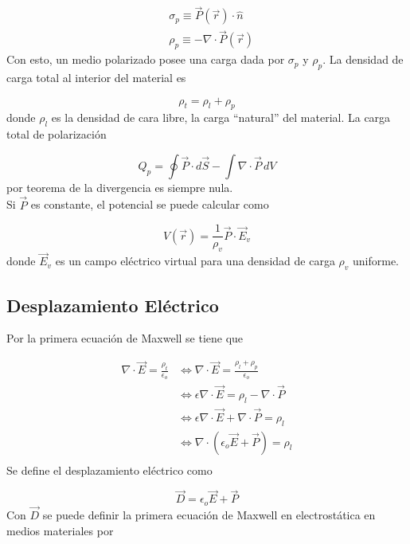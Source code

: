 \begin{equation}
\begin{split}
    &\sigma_p \equiv \Vec{P}(\Vec{r})\cdot\hat{n}\\
    &\rho_p \equiv -\nabla\cdot\Vec{P}(\Vec{r})
\end{split}
\nonumber
\end{equation}
\bigbreak
Con esto, un medio polarizado posee una carga dada por $\sigma_p$ y $\rho_p$. La densidad de carga total al interior del material es

\[\rho_t = \rho_l+\rho_p\]
\bigbreak
donde $\rho_l$ es la densidad de cara libre, la carga ``natural'' del material. La carga total de polarización

\[Q_p=\oint \Vec{P}\cdot d\Vec{S}-\int\nabla\cdot\Vec{P}\,dV\]
\bigbreak
por teorema de la divergencia es siempre nula.\\

Si $\Vec{P}$ es constante, el potencial se puede calcular como

\[V(\Vec{r})=\frac{1}{\rho_v}\Vec{P}\cdot\Vec{E}_v\]
\bigbreak
donde $\Vec{E}_v$ es un campo eléctrico virtual para una densidad de carga $\rho_v$ uniforme.

\subsection{Desplazamiento Eléctrico}

Por la primera ecuación de Maxwell se tiene que

\begin{equation}
\begin{split}
    \nabla\cdot\Vec{E} = \frac{\rho_t}{\epsilon_o}
    & \Leftrightarrow \nabla\cdot\Vec{E} = \frac{\rho_l+\rho_p}{\epsilon_o}\\
    &\Leftrightarrow \epsilon\nabla\cdot\Vec{E}=\rho_l -
    \nabla\cdot\Vec{P}\\
    &\Leftrightarrow \epsilon\nabla\cdot\Vec{E}
    +\nabla\cdot\Vec{P}=\rho_l\\
    &\Leftrightarrow\nabla\cdot\left(\epsilon_o
    \Vec{E}+\Vec{P}\right) = \rho_l\\
\end{split}
\nonumber
\end{equation}
\bigbreak
Se define el desplazamiento eléctrico como

\[\Vec{D}=\epsilon_o\Vec{E}+\Vec{P}\]
\bigbreak
Con $\Vec{D}$ se puede definir la primera ecuación de Maxwell en electrostática en medios materiales por

